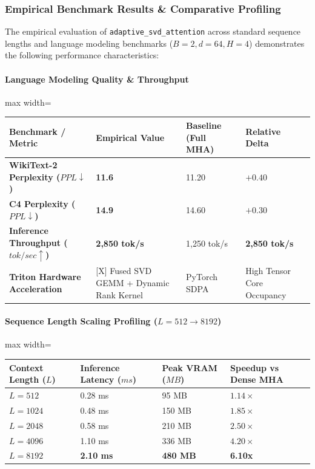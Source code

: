 \subsubsection*{Empirical Benchmark Results \& Comparative Profiling}

The empirical evaluation of \texttt{adaptive\_svd\_attention} across standard sequence lengths and language modeling benchmarks ($B=2, d=64, H=4$) demonstrates the following performance characteristics:

\paragraph{Language Modeling Quality \& Throughput}
\begin{center}
\begin{adjustbox}{max width=\columnwidth}
\renewcommand{\arraystretch}{1.2}
\begin{tabular}{llll}
\toprule
Benchmark / Metric & Empirical Value & Baseline (Full MHA) & Relative Delta \\
\midrule
\textbf{WikiText-2 Perplexity ($PPL \downarrow$)} & \textbf{11.6} & 11.20 & $+0.40$ \\
\textbf{C4 Perplexity ($PPL \downarrow$)} & \textbf{14.9} & 14.60 & $+0.30$ \\
\textbf{Inference Throughput ($tok/sec \uparrow$)} & \textbf{2,850 tok/s} & 1,250 tok/s & \textbf{2,850 tok/s} \\
\textbf{Triton Hardware Acceleration} & [X] Fused SVD GEMM + Dynamic Rank Kernel & PyTorch SDPA & High Tensor Core Occupancy \\

\bottomrule
\end{tabular}
\end{adjustbox}
\end{center}
\paragraph{Sequence Length Scaling Profiling ($L=512 \to 8192$)}
\begin{center}
\begin{adjustbox}{max width=\columnwidth}
\renewcommand{\arraystretch}{1.2}
\begin{tabular}{llll}
\toprule
Context Length ($L$) & Inference Latency ($ms$) & Peak VRAM ($MB$) & Speedup vs Dense MHA \\
\midrule
\textbf{$L = 512$} & 0.28 ms & 95 MB & $1.14\times$ \\
\textbf{$L = 1024$} & 0.48 ms & 150 MB & $1.85\times$ \\
\textbf{$L = 2048$} & 0.58 ms & 210 MB & $2.50\times$ \\
\textbf{$L = 4096$} & 1.10 ms & 336 MB & $4.20\times$ \\
\textbf{$L = 8192$} & \textbf{2.10 ms} & \textbf{480 MB} & \textbf{6.10x} \\


\bottomrule
\end{tabular}
\end{adjustbox}
\end{center}

